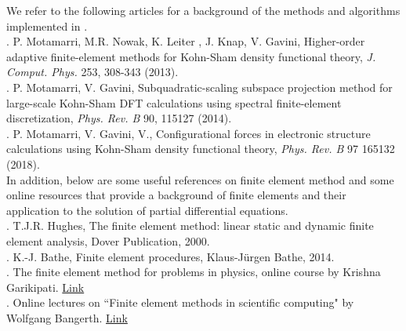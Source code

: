 We refer to the following articles for a background of the methods and algorithms implemented in \dftfe. \\

. P. Motamarri, M.R. Nowak, K. Leiter , J. Knap, V. Gavini, Higher-order adaptive finite-element methods for Kohn-Sham density functional theory, \emph{J. Comput. Phys.} 253, 308-343 (2013).\\
 
 . P. Motamarri, V. Gavini, Subquadratic-scaling subspace projection method for large-scale Kohn-Sham DFT calculations using spectral finite-element discretization, \emph{Phys. Rev. B} 90, 115127 (2014).\\

. P. Motamarri, V. Gavini, V., Configurational forces in electronic structure calculations using Kohn-Sham density functional theory, \emph{Phys. Rev. B} 97 165132 (2018).\\

\noindent In addition, below are some useful references on finite element method and some online resources that provide a background of finite elements and their application to the solution of partial differential equations.\\

. T.J.R. Hughes, The finite element method: linear static and dynamic finite element analysis, Dover Publication, 2000.\\

. K.-J. Bathe, Finite element procedures, Klaus-J\"{u}rgen Bathe, 2014.\\

. The finite element method for problems in physics, online course by Krishna Garikipati. \href{https://www.coursera.org/learn/finite-element-method}{Link}\\

. Online lectures on ``Finite element methods in scientific computing" by Wolfgang Bangerth. \href{http://www.math.colostate.edu/~bangerth/videos.html}{Link}\\ 

